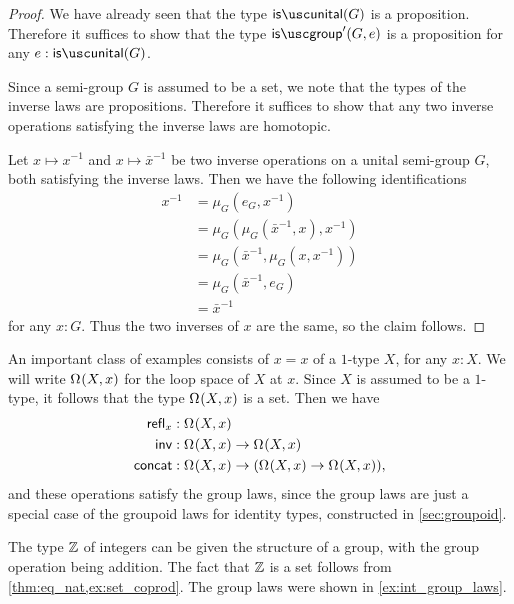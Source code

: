 \begin{proof}
  We have already seen that the type $\isunital(G)$ is a proposition. Therefore it suffices to show that the type $\isgroup'(G,e)$ is a proposition for any $e:\isunital(G)$.

  Since a semi-group $G$ is assumed to be a set, we note that the types of the inverse laws are propositions. Therefore it suffices to show that any two inverse operations satisfying the inverse laws are homotopic.

  Let $x\mapsto x^{-1}$ and $x\mapsto \bar{x}^{-1}$ be two inverse operations on a unital semi-group $G$, both satisfying the inverse laws. Then we have the following identifications
  \begin{align*}
    x^{-1} & = \mu_G(e_G,x^{-1}) \\
    & = \mu_G(\mu_G(\bar{x}^{-1},x),x^{-1}) \\
    & = \mu_G(\bar{x}^{-1},\mu_G(x,x^{-1})) \\
    & = \mu_G(\bar{x}^{-1},e_G) \\
    & = \bar{x}^{-1}
  \end{align*}
  for any $x:G$. Thus the two inverses of $x$ are the same, so the claim follows.
\end{proof}

\begin{eg}
  An important class of examples consists of  $x=x$ of a $1$-type $X$, for any $x:X$. 
  We will write $\Omega^{}(X,x)$ for the loop space of $X$ at $x$. 
  Since $X$ is assumed to be a $1$-type, it follows that the type $\Omega^{}(X,x)$ is a set. Then we have
  \begin{align*}
    \mathsf{refl}_{x} & : \Omega^{}(X,x) \\
    \mathsf{inv} & : \Omega^{}(X,x) \to \Omega^{}(X,x) \\
    \mathsf{concat} & : \Omega^{}(X,x) \to (\Omega^{}(X,x)\to \Omega^{}(X,x)),
  \end{align*}
  and these operations satisfy the group laws, since the group laws are just a special case of the groupoid laws for identity types, constructed in \cref{sec:groupoid}.
\end{eg}

\begin{eg}
  The type ${\mathbb{Z}}$ of integers can be given the structure of a group, with the group operation being addition. The fact that ${\mathbb{Z}}$ is a set follows from \cref{thm:eq_nat,ex:set_coprod}. The group laws were shown in \cref{ex:int_group_laws}. 
\end{eg}

